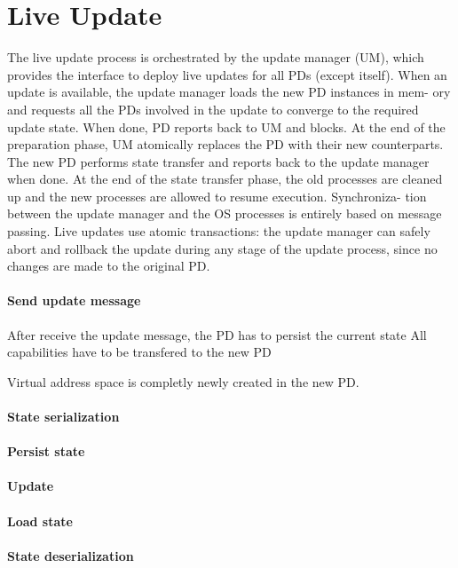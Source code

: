 \section{Live Update}

The live update process is orchestrated by the update manager (UM), which provides
the interface to deploy live updates for all PDs (except itself). When
an update is available, the update manager loads the new PD instances in mem-
ory and requests all the PDs involved in the update to converge to the required
update state. When done, PD reports back to UM and blocks. At the end
of the preparation phase, UM atomically replaces the PD with their new
counterparts. The new PD performs state transfer and reports back to the update
manager when done. At the end of the state transfer phase, the old processes are
cleaned up and the new processes are allowed to resume execution. Synchroniza-
tion between the update manager and the OS processes is entirely based on message
passing. 
Live updates use atomic transactions: the update manager can safely abort
and rollback the update during any stage of the update process, since no changes are
made to the original PD. 


\paragraph{Send update message}
After receive the update message, the PD has to persist 
the current state
All capabilities have to be transfered to the new PD

Virtual address space is completly newly created in the new PD.

\paragraph{State serialization}
\paragraph{Persist state}
\paragraph{Update}
\paragraph{Load state}
\paragraph{State deserialization}

